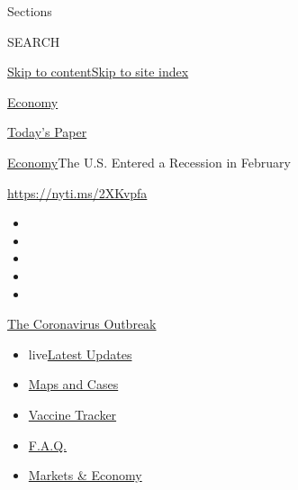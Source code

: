 Sections

SEARCH

\protect\hyperlink{site-content}{Skip to
content}\protect\hyperlink{site-index}{Skip to site index}

\href{https://www.nytimes.com/section/business/economy}{Economy}

\href{https://myaccount.nytimes.com/auth/login?response_type=cookie\&client_id=vi}{}

\href{https://www.nytimes.com/section/todayspaper}{Today's Paper}

\href{/section/business/economy}{Economy}\textbar{}The U.S. Entered a
Recession in February

\href{https://nyti.ms/2XKvpfa}{https://nyti.ms/2XKvpfa}

\begin{itemize}
\item
\item
\item
\item
\item
\end{itemize}

\href{https://www.nytimes.com/news-event/coronavirus?action=click\&pgtype=Article\&state=default\&region=TOP_BANNER\&context=storylines_menu}{The
Coronavirus Outbreak}

\begin{itemize}
\tightlist
\item
  live\href{https://www.nytimes.com/2020/08/08/world/coronavirus-updates.html?action=click\&pgtype=Article\&state=default\&region=TOP_BANNER\&context=storylines_menu}{Latest
  Updates}
\item
  \href{https://www.nytimes.com/interactive/2020/us/coronavirus-us-cases.html?action=click\&pgtype=Article\&state=default\&region=TOP_BANNER\&context=storylines_menu}{Maps
  and Cases}
\item
  \href{https://www.nytimes.com/interactive/2020/science/coronavirus-vaccine-tracker.html?action=click\&pgtype=Article\&state=default\&region=TOP_BANNER\&context=storylines_menu}{Vaccine
  Tracker}
\item
  \href{https://www.nytimes.com/interactive/2020/world/coronavirus-tips-advice.html?action=click\&pgtype=Article\&state=default\&region=TOP_BANNER\&context=storylines_menu}{F.A.Q.}
\item
  \href{https://www.nytimes.com/live/2020/08/07/business/stock-market-today-coronavirus?action=click\&pgtype=Article\&state=default\&region=TOP_BANNER\&context=storylines_menu}{Markets
  \& Economy}
\end{itemize}

